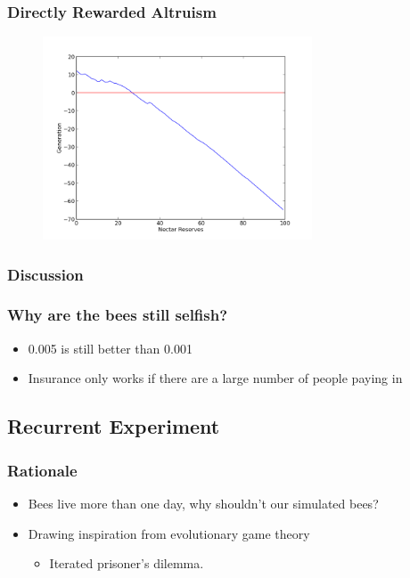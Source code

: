 \documentclass{beamer}
\begin{document}
        \begin{frame}[t]\frametitle{Directly Rewarded Altruism}
          \begin{figure}
          \includegraphics[width=8cm]{hive_influenced_bees_nectar.png}
          \end{figure}
        \end{frame}



      \subsubsection{Discussion} %
      \label{ssub:discussion}

        \begin{frame}[c]\frametitle{Why are the bees still selfish?}

          \begin{itemize}
            \item 0.005 is still better than 0.001
            \item Insurance only works if there are a large number of people
                  paying in
          \end{itemize}
        
        \end{frame}


    \subsection{Recurrent Experiment} %
    \label{sub:recurrent_experiment}
    
      \begin{frame}[c]\frametitle{Rationale}
        \begin{itemize}
          \item Bees live more than one day, why shouldn't our simulated bees?
          \item Drawing inspiration from evolutionary game theory
          \begin{itemize}
            \item Iterated prisoner's dilemma.
          \end{itemize}
        \end{itemize}
      \end{frame}
\end{document}
